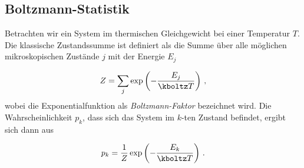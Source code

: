 \subsection*{Boltzmann-Statistik}

Betrachten wir ein System im thermischen Gleichgewicht bei einer Temperatur $T$. Die klassische Zustandssumme ist definiert als die Summe über alle möglichen mikroskopischen Zustände $j$ mit der Energie $E_j$

\begin{equation*}\label{eq:ideal-nr}
  Z=\sum_j \exp \left(-\frac{E_j}{\kboltz T}\right)\,,
\end{equation*}
%
wobei die Exponentialfunktion als \emph{Boltzmann-Faktor} bezeichnet wird. Die Wahrscheinlichkeit $p_k$, dass sich das System im $k$-ten Zustand befindet, ergibt sich dann aus

\begin{equation*}\label{eq:ideal-nr}
  p_k=\frac{1}{Z} \exp \left(-\frac{E_k}{\kboltz T}\right)\,.
\end{equation*}